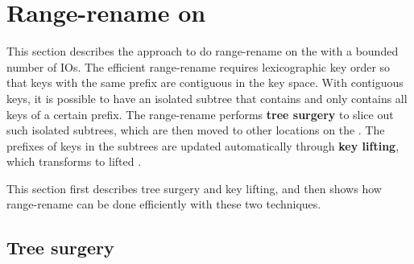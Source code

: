\section{Range-rename on \bets}

This section describes the approach to do range-rename on the \bet
with a bounded number of IOs.
The efficient range-rename requires lexicographic key order so that keys with
the same prefix are contiguous in the key space.
With contiguous keys, it is possible to have an isolated subtree that contains
and only contains all keys of a certain prefix.
The range-rename performs \textbf{tree surgery} to slice out such isolated
subtrees, which are then moved to other locations on the \bet.
The prefixes of keys in the subtrees are updated automatically through
\textbf{key lifting}, which transforms \bets to lifted \bets.

This section first describes tree surgery and key lifting, and then shows how
range-rename can be done efficiently with these two techniques.

\subsection{Tree surgery}

